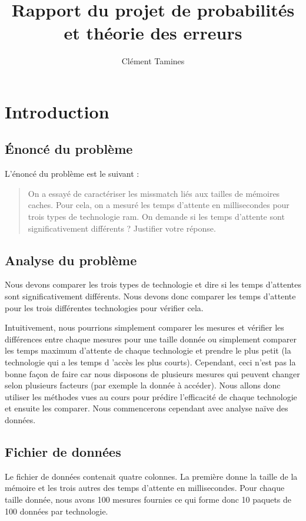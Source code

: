 \documentclass[a4paper,10pt]{article}
\title{Rapport du projet de probabilités et théorie des erreurs}
\author{Clément Tamines}
\begin{document}
\maketitle

\newpage

\tableofcontents

\newpage

\section{Introduction}

\subsection{Énoncé du problème}
L'énoncé du problème est le suivant :
\begin{quote}
On a essayé de caractériser les missmatch liés aux tailles de mémoires caches. 
Pour cela, on a mesuré les temps d'attente en millisecondes pour trois types de technologie ram. 
On demande si les temps d'attente sont significativement différents ? Justifier votre réponse.
\end{quote}

\subsection{Analyse du problème}
Nous devons comparer les trois types de technologie et dire si les temps d'attentes sont significativement différents.
Nous devons donc comparer les temps d'attente pour les trois différentes technologies pour vérifier cela.

Intuitivement, nous pourrions simplement comparer les mesures et vérifier les différences entre chaque mesures pour une taille donnée ou simplement
comparer les temps maximum d'attente de chaque technologie et prendre le plus petit (la technologie qui a les temps d 'accès les plus courts).
Cependant, ceci n'est pas la bonne façon de faire car nous disposons de plusieurs mesures qui peuvent changer selon plusieurs facteurs (par exemple la donnée à accéder).
Nous allons donc utiliser les méthodes vues au cours pour prédire l'efficacité de chaque technologie et ensuite les comparer. Nous commencerons cependant avec analyse naïve des données.

\subsection{Fichier de données}
Le fichier de données contenait quatre colonnes. La première donne la taille de la mémoire et les trois autres des temps d'attente en millisecondes.
Pour chaque taille donnée, nous avons 100 mesures fournies ce qui forme donc 10 paquets de 100 données par technologie.
\end{document}
